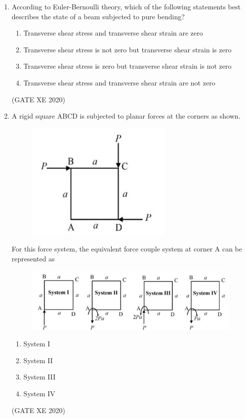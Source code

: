 \documentclass[12pt]{article}
\begin{document}
\begin{enumerate}
\item According to Euler-Bernoulli theory, which of the following statements best describes the state of a beam subjected to pure bending?
\begin{enumerate}
\item Transverse shear stress and transverse shear strain are zero
\item Transverse shear stress is not zero but transverse shear strain is zero
\item Transverse shear stress is zero but transverse shear strain is not zero
\item Transverse shear stress and transverse shear strain are not zero
\end{enumerate}
(GATE XE 2020)

\item A rigid square ABCD is subjected to planar forces at the corners as shown.
\begin{figure}[H]
    \centering
    \includegraphics[width=0.5\columnwidth]{figs/ass4_d_q6_1.png}
    \caption{}
    \label{fig:placeholder}
\end{figure}

For this force system, the equivalent force couple system at corner A can be represented as 

\begin{figure}[H]
    \centering
    \includegraphics[width=0.8\columnwidth]{figs/ass4_d_q6_2.png}
    \caption{}
    \label{fig:placeholder}
\end{figure}

\begin{enumerate}
\item System I
\item System II
\item System III
\item System IV
\end{enumerate}
(GATE XE 2020)


\end{enumerate}
\end{document}

